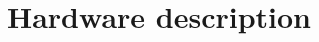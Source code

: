 \documentclass[11pt, letterpaper]{article}
\begin{document}
\section{Hardware description}


\end{document}
